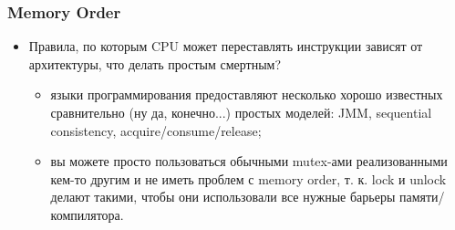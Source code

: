 \begin{frame}
\frametitle{Memory Order}
\begin{itemize}
  \item Правила, по которым CPU может переставлять инструкции зависят от
  архитектуры, что делать простым смертным?
  \begin{itemize}
    \item языки программирования предоставляют несколько хорошо известных
    сравнительно (ну да, конечно...) простых моделей: JMM, sequential
    consistency, acquire/consume/release;
    \item вы можете просто пользоваться обычными mutex-ами реализованными
    кем-то другим и не иметь проблем с memory order, т. к. lock и unlock
    делают такими, чтобы они использовали все нужные барьеры памяти/компилятора.
  \end{itemize}
\end{itemize}
\end{frame}
